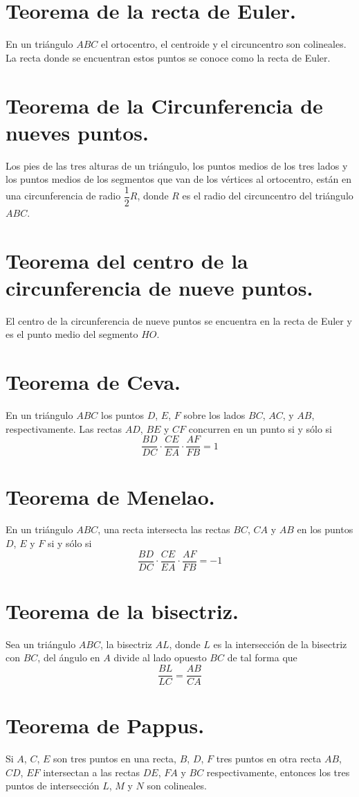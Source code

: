 \documentclass[12pt,a4paper]{book}
\begin{document}
\section{Teorema de la recta de Euler.}
En un triángulo $ABC$ el ortocentro, el centroide y el circuncentro son colineales. La recta donde se encuentran estos puntos se conoce como la recta de Euler.
\section{Teorema de la Circunferencia de nueves puntos.}
Los pies de las tres alturas de un triángulo, los puntos medios de los tres lados y los puntos medios de los segmentos que van de los vértices al ortocentro, están en una circunferencia de radio $\dfrac{1}{2}R$, donde $R$ es el radio del circuncentro del triángulo $ABC$.
\section{Teorema del centro de la circunferencia de nueve puntos.}
El centro de la circunferencia de nueve puntos se encuentra en la recta de Euler y es el punto medio del segmento $HO$.
\section{Teorema de Ceva.}
En un triángulo $ABC$ los puntos $D$, $E$, $F$ sobre los lados $BC$, $AC$, y $AB$, respectivamente. Las rectas $AD$, $BE$ y $CF$ concurren en un punto si y sólo si
$$\dfrac{BD}{DC}\cdot\dfrac{CE}{EA}\cdot\dfrac{AF}{FB}=1$$
\section{Teorema de Menelao.}
En un triángulo $ABC$, una recta intersecta las rectas $BC$, $CA$ y $AB$ en los puntos $D$, $E$ y $F$ si y sólo si
$$\dfrac{BD}{DC}\cdot\dfrac{CE}{EA}\cdot\dfrac{AF}{FB}=-1$$
\section{Teorema de la bisectriz.}
Sea un triángulo $ABC$, la bisectriz $AL$, donde $L$ es la intersección de la bisectriz con $BC$, del ángulo en $A$ divide al lado opuesto $BC$ de tal forma que
$$\dfrac{BL}{LC}=\dfrac{AB}{CA}$$
\section{Teorema de Pappus.}
Si $A$, $C$, $E$ son tres puntos en una recta, $B$, $D$, $F$ tres puntos en otra recta $AB$, $CD$, $EF$ intersectan a las rectas $DE$, $FA$ y $BC$ respectivamente, entonces los tres puntos de intersección $L$, $M$ y $N$ son colineales.
\end{document}

